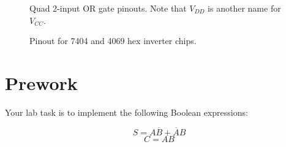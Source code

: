 \documentclass{UoNMCHA}
\numberwithin{equation}{section}
\begin{document}
\begin{figure}[h!]
\centering
    \qquad
    \caption{Quad 2-input OR gate pinouts. Note that $V_{DD}$ is another name for $V_{CC}$.}
    \label{ORPinout}
\end{figure}

\begin{figure}[h!]
\caption{Pinout for 7404 and 4069 hex inverter chips.}
\label{NOTPinout}
\end{figure}

\section{Prework}

Your lab task is to implement the following Boolean expressions:

\begin{equation} \label{eq:sum}
S = A \overline{B} + \overline{A} B
\end{equation}
\begin{equation} \label{eq:carry}
C = AB    
\end{equation}
\end{document}
